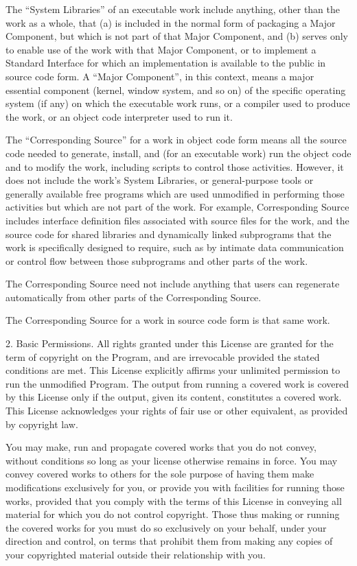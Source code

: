 The “System Libraries” of an executable work include anything, other than the work as a whole, that (a) is included in the normal form of packaging a Major Component, but which is not part of that Major Component, and (b) serves only to enable use of the work with that Major Component, or to implement a Standard Interface for which an implementation is available to the public in source code form. A “Major Component”, in this context, means a major essential component (kernel, window system, and so on) of the specific operating system (if any) on which the executable work runs, or a compiler used to produce the work, or an object code interpreter used to run it.

The “Corresponding Source” for a work in object code form means all the source code needed to generate, install, and (for an executable work) run the object code and to modify the work, including scripts to control those activities. However, it does not include the work's System Libraries, or general-purpose tools or generally available free programs which are used unmodified in performing those activities but which are not part of the work. For example, Corresponding Source includes interface definition files associated with source files for the work, and the source code for shared libraries and dynamically linked subprograms that the work is specifically designed to require, such as by intimate data communication or control flow between those subprograms and other parts of the work.

The Corresponding Source need not include anything that users can regenerate automatically from other parts of the Corresponding Source.

The Corresponding Source for a work in source code form is that same work.

2. Basic Permissions.
All rights granted under this License are granted for the term of copyright on the Program, and are irrevocable provided the stated conditions are met. This License explicitly affirms your unlimited permission to run the unmodified Program. The output from running a covered work is covered by this License only if the output, given its content, constitutes a covered work. This License acknowledges your rights of fair use or other equivalent, as provided by copyright law.

You may make, run and propagate covered works that you do not convey, without conditions so long as your license otherwise remains in force. You may convey covered works to others for the sole purpose of having them make modifications exclusively for you, or provide you with facilities for running those works, provided that you comply with the terms of this License in conveying all material for which you do not control copyright. Those thus making or running the covered works for you must do so exclusively on your behalf, under your direction and control, on terms that prohibit them from making any copies of your copyrighted material outside their relationship with you.

